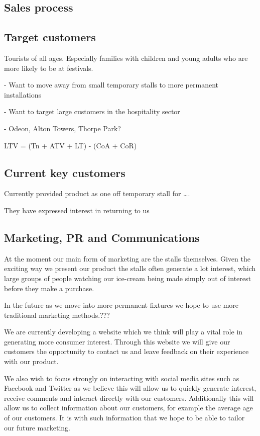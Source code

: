 \documentclass{article}
\begin{document}
  \subsection{Sales process}

  \subsection{Target customers}
Tourists of all ages. Especially families with children and young adults
who are more likely to be at festivals.

 - Want to move away from small temporary stalls to more permanent
installations

 - Want to target large customers in the hospitality sector

 - Odeon, Alton Towers, Thorpe Park?

   LTV = (Tn + ATV + LT) - (CoA + CoR) 

  \subsection{Current key customers}

  Currently provided product as one off temporary stall for ….

  They have expressed interest in returning to us

  \subsection{Marketing, PR and Communications}
  At the moment our main form of marketing are the stalls themselves.
Given the exciting way we present our product the stalls often generate
a lot interest, which large groups of people watching our ice-cream
being made simply out of interest before they make a purchase.

In the future as we move into more permanent fixtures we hope to use
more traditional marketing methods.???

We are currently developing a website which we think will play a vital
role in generating more consumer interest. Through this website we will
give our customers the opportunity to contact us and leave feedback on
their experience with our product.

We also wish to focus strongly on interacting with social media sites
such as Facebook and Twitter as we believe this will allow us to quickly
generate interest, receive comments and interact directly with our
customers. Additionally this will allow us to collect information about
our customers, for example the average age of our customers. It is with
such information that we hope to be able to tailor our future marketing.
\end{document}
